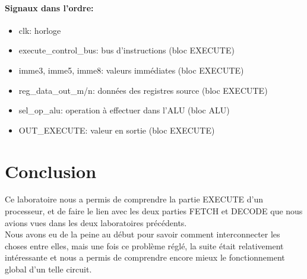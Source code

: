 \documentclass[a4paper]{article} %
\begin{document}
\paragraph{Signaux dans l'ordre:}
\begin{itemize}
    \item     clk: horloge
    \item     execute\_control\_bus: bus d'instructions (bloc EXECUTE)
    \item     imme3, imme5, imme8: valeurs immédiates (bloc EXECUTE)
    \item     reg\_data\_out\_m/n: données des registres source (bloc EXECUTE)
    \item     sel\_op\_alu: operation à effectuer dans l'ALU (bloc ALU)
    \item     OUT\_EXECUTE: valeur en sortie (bloc EXECUTE)
\end{itemize}
\section{Conclusion}
Ce laboratoire nous a permis de comprendre la partie EXECUTE d'un processeur, et de faire le lien avec les deux parties FETCH et DECODE que nous avions vues dans les deux laboratoires précédents.\\
Nous avons eu de la peine au début pour savoir comment interconnecter les choses entre elles, mais une fois ce problème réglé, la suite était relativement intéressante et nous a permis de comprendre encore mieux le fonctionnement global d'un telle circuit.
\end{document}
